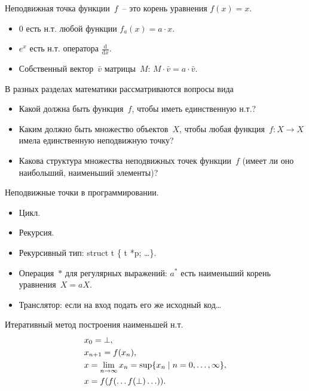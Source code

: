 \documentclass[landscape]{slides}
\begin{document}
\begin{slide}
        Неподвижная точка функции~$f$~-- это корень уравнения $f(x)=x$.
        \begin{itemize}
                \item 0 есть н.т. любой функции $f_a(x) = a\cdot x$.
                \item $e^x$ есть н.т. оператора $\frac{\mathrm{d}}{\mathrm{d} x}$.
                \item Собственный вектор~$\bar{v}$ матрицы~$M$: $M\cdot \bar{v} = a \cdot \bar{v}$.
        \end{itemize}

        В разных разделах математики рассматриваются вопросы вида
        \begin{itemize}
                \item Какой должна быть функция~$f$, чтобы иметь единственную н.т.?
                \item Каким должно быть множество объектов~$X$, чтобы любая функция~$f: X \to X$ имела единственную неподвижную точку?
                \item Какова структура множества неподвижных точек функции~$f$ (имеет ли оно наибольший, наименьший элементы)?
        \end{itemize}
\end{slide}

\begin{slide}
        Неподвижные точки в программировании.
        \begin{itemize}
                \item Цикл.
                \item Рекурсия.
                \item Рекурсивный тип: struct t \{ t *p; \ldots \}.
                \item Операция~$\ast$ для регулярных выражений: $a^\ast$ есть наименьший корень уравнения~$X = aX$.
                \item Транслятор: если на вход подать его же исходный код\ldots
        \end{itemize}

        Итеративный метод построения наименьшей н.т.
        \begin{eqnarray*}
                &x_0 = \bot,\\
                &x_{n+1} = f(x_n),\\
                &x = \lim_{n\to\infty} x_n = \mathrm{sup} \{ x_n \mid n=0,\ldots,\infty\},\\
                &x = f(f(\ldots f(\bot) \ldots)) .
        \end{eqnarray*}
\end{slide}
\end{document}
